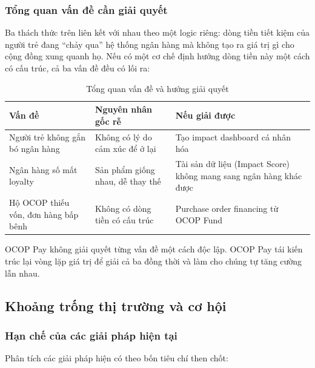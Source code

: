 \documentclass[13pt,a4paper]{extarticle}
\begin{document}
\subsubsection{Tổng quan vấn đề cần giải quyết}

Ba thách thức trên liên kết với nhau theo một logic riêng: dòng tiền tiết kiệm của người trẻ đang ``chảy qua'' hệ thống ngân hàng mà không tạo ra giá trị gì cho cộng đồng xung quanh họ. Nếu có một cơ chế định hướng dòng tiền này một cách có cấu trúc, cả ba vấn đề đều có lối ra:

\begin{table}[H]
\centering
\caption{Tổng quan vấn đề và hướng giải quyết}
\begin{tabular}{|p{3.5cm}|p{4.5cm}|p{5cm}|}
\hline
\textbf{Vấn đề} & \textbf{Nguyên nhân gốc rễ} & \textbf{Nếu giải được} \\
\hline
Người trẻ không gắn bó ngân hàng & Không có lý do cảm xúc để ở lại & Tạo impact dashboard cá nhân hóa \\
\hline
Ngân hàng số mất loyalty & Sản phẩm giống nhau, dễ thay thế & Tài sản dữ liệu (Impact Score) không mang sang ngân hàng khác được \\
\hline
Hộ OCOP thiếu vốn, đơn hàng bấp bênh & Không có dòng tiền có cấu trúc & Purchase order financing từ OCOP Fund \\
\hline
\end{tabular}
\end{table}

OCOP Pay không giải quyết từng vấn đề một cách độc lập. OCOP Pay tái kiến trúc lại vòng lặp giá trị để giải cả ba đồng thời và làm cho chúng tự tăng cường lẫn nhau.

\subsection{Khoảng trống thị trường và cơ hội}

\subsubsection{Hạn chế của các giải pháp hiện tại}

Phân tích các giải pháp hiện có theo bốn tiêu chí then chốt:
\end{document}
